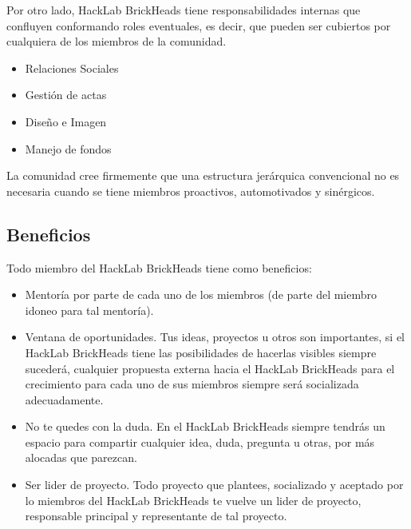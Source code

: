 \documentclass[12pt, letterpaper]{article}
\begin{document}
    Por otro lado, HackLab BrickHeads tiene responsabilidades internas que 
    confluyen conformando roles eventuales, es decir, que pueden ser cubiertos 
    por cualquiera de los miembros de la comunidad.
    \begin{itemize}
        \item Relaciones Sociales
        \item Gestión de actas
        \item Diseño e Imagen
        \item Manejo de fondos
    \end{itemize}

    La comunidad cree firmemente que una estructura jerárquica convencional no
    es necesaria cuando se tiene miembros proactivos, automotivados y
    sinérgicos.

    \subsection{Beneficios}
    Todo miembro del HackLab BrickHeads tiene como beneficios:
    \begin{itemize}
        \item Mentoría por parte de cada uno de los miembros (de parte del 
        miembro idoneo para tal mentoría).
        \item Ventana de oportunidades. Tus ideas, proyectos u otros son 
        importantes, si el HackLab BrickHeads tiene las posibilidades 
        de hacerlas visibles siempre sucederá, cualquier propuesta externa 
        hacia el HackLab BrickHeads para el crecimiento para cada uno de sus
        miembros siempre será socializada adecuadamente.
        \item No te quedes con la duda. En el HackLab BrickHeads siempre tendrás
        un espacio para compartir cualquier idea, duda, pregunta u otras, por 
        más alocadas que parezcan.
        \item Ser lider de proyecto. Todo proyecto que plantees, socializado y 
        aceptado por lo miembros del HackLab BrickHeads te vuelve un lider 
        de proyecto, responsable principal y representante de tal proyecto.
    \end{itemize}
\end{document}
